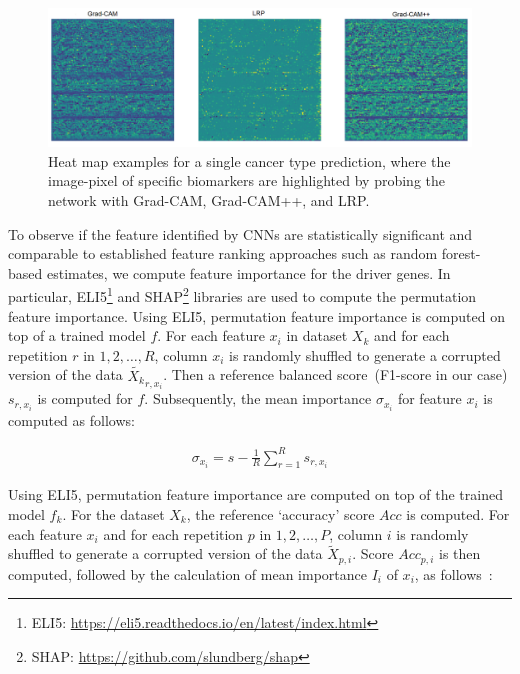 \begin{figure}[h]
	\centering
	\includegraphics[scale=0.7]{images/3_mode.png}
	\caption[Heat map examples for a single cancer type prediction]{Heat map examples for a single cancer type prediction, where the image-pixel of specific biomarkers are highlighted by probing the network with Grad-CAM, Grad-CAM++, and LRP.} 
	\label{fig:3hms}
\end{figure}

\hspace*{3.5mm} To observe if the feature identified by CNNs are statistically significant and comparable to established feature ranking approaches such as random forest-based estimates, we compute feature importance for the driver genes. In particular, ELI5\footnote{ELI5: \url{https://eli5.readthedocs.io/en/latest/index.html}} and SHAP\footnote{SHAP: \url{https://github.com/slundberg/shap}} libraries are used to compute the permutation feature importance. Using ELI5, permutation feature importance is computed on top of a trained model $f$. For each feature $x_i$ in dataset $X_k$ and for each repetition $r$ in $1, 2, \ldots, R$, column $x_i$ is randomly shuffled to generate a corrupted version of the data $\tilde{X_k}_{r,x_i}$. Then a reference balanced score~(F1-score in our case) $s_{r,x_i}$ is computed for $f$. Subsequently, the mean importance $\sigma_{x_i}$ for feature $x_{i}$ is computed as follows: 

\begin{align}
    \sigma_{x_i}=s-\frac{1}{R} \sum_{r=1}^{R} s_{r,x_i}
\end{align}

\iffalse
Using ELI5, permutation feature importance are computed on top of the trained model $f_k$. For the dataset $X_k$, the reference `accuracy' score $Acc$ is computed. For each feature $x_i$ and for each repetition $p$ in $1, 2, \ldots, P$, column $i$ is randomly shuffled to generate a corrupted version of the data $\tilde{X}_{p,i}$. Score $Acc_{p,i}$ is then computed, followed by the calculation of mean importance $I_{i}$ of $x_{i}$, as follows~\cite{SHAP}:

